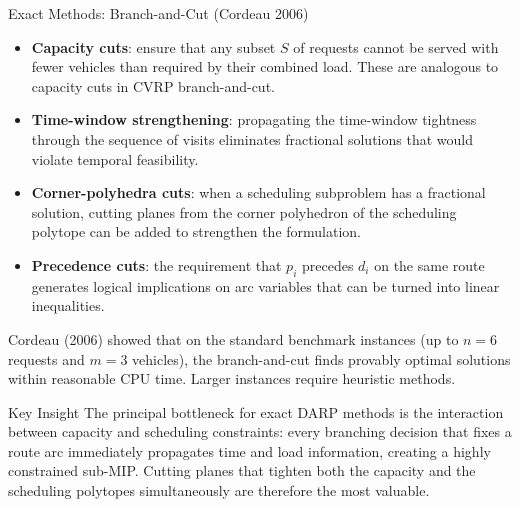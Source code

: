 \documentclass[aspectratio=169,10pt]{beamer}
\begin{document}
\begin{frame}[allowframebreaks]{Exact Methods: Branch-and-Cut (Cordeau 2006)}
  \begin{itemize}
    \item \textbf{Capacity cuts}: ensure that any subset $S$ of requests
          cannot be served with fewer vehicles than required by their combined
          load.  These are analogous to capacity cuts in CVRP branch-and-cut.
    \item \textbf{Time-window strengthening}: propagating the time-window
          tightness through the sequence of visits eliminates fractional
          solutions that would violate temporal feasibility.
    \item \textbf{Corner-polyhedra cuts}: when a scheduling subproblem has a
          fractional solution, cutting planes from the corner polyhedron of
          the scheduling polytope can be added to strengthen the formulation.
    \item \textbf{Precedence cuts}: the requirement that $p_i$ precedes
          $d_i$ on the same route generates logical implications on arc
          variables that can be turned into linear inequalities.
  \end{itemize}

  Cordeau (2006) showed that on the standard benchmark instances (up to
  $n = 6$ requests and $m = 3$ vehicles), the branch-and-cut finds provably
  optimal solutions within reasonable CPU time.  Larger instances require
  heuristic methods.

  \begin{alertblock}{Key Insight}
    The principal bottleneck for exact DARP methods is the interaction between
    capacity and scheduling constraints: every branching decision that fixes a
    route arc immediately propagates time and load information, creating a
    highly constrained sub-MIP.  Cutting planes that tighten both the
    capacity and the scheduling polytopes simultaneously are therefore the
    most valuable.
  \end{alertblock}

\end{frame}
\end{document}
